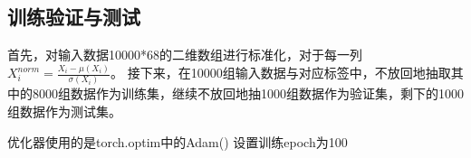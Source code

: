 \documentclass{article}
\begin{document}
\subsection*{训练验证与测试}

首先，对输入数据10000*68的二维数组进行标准化，对于每一列$X^{norm}_i=\frac{X_i-\mu(X_i)}{\sigma(X_i) } $。
接下来，在10000组输入数据与对应标签中，不放回地抽取其中的8000组数据作为训练集，继续不放回地抽1000组数据作为验证集，剩下的1000组数据作为测试集。

优化器使用的是torch.optim中的Adam()
设置训练epoch为100
\end{document}
